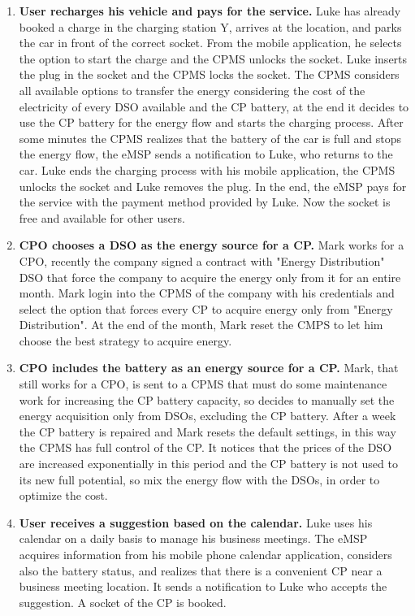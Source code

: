 \documentclass{Configuration_Files/PoliMi3i_thesis}
\begin{document}
\begin{enumerate}
    \item \textbf{User recharges his vehicle and pays for the service.} \newline
    Luke has already booked a charge in the charging station Y, arrives at the location, and parks the car in front of the correct socket. From the mobile application, he selects the option to start the charge and the CPMS unlocks the socket. Luke inserts the plug in the socket and the CPMS locks the socket. The CPMS considers all available options to transfer the energy considering the cost of the electricity of every DSO available and the CP battery, at the end it decides to use the CP battery for the energy flow and starts the charging process. After some minutes the CPMS realizes that the battery of the car is full and stops the energy flow, the eMSP sends a notification to Luke, who returns to the car. Luke ends the charging process with his mobile application, the CPMS unlocks the socket and Luke removes the plug. In the end, the eMSP pays for the service with the payment method provided by Luke. Now the socket is free and available for other users.

    \item \textbf{CPO chooses a DSO as the energy source for a CP.} \newline
    Mark works for a CPO, recently the company signed a contract with "Energy Distribution" DSO that force the company to acquire the energy only from it for an entire month. Mark login into the CPMS of the company with his credentials and select the option that forces every CP to acquire energy only from "Energy Distribution". At the end of the month, Mark reset the CMPS to let him choose the best strategy to acquire energy.

    \item \textbf{CPO includes the battery as an energy source for a CP.} \newline
    Mark, that still works for a CPO, is sent to a CPMS that must do some maintenance work for increasing the CP battery capacity, so decides to manually set the energy acquisition only from DSOs, excluding the CP battery. After a week the CP battery is repaired and Mark resets the default settings, in this way the CPMS has full control of the CP. It notices that the prices of the DSO are increased exponentially in this period and the CP battery is not used to its new full potential, so mix the energy flow with the DSOs, in order to optimize the cost.

    \item \textbf{User receives a suggestion based on the calendar.} \newline
    Luke uses his calendar on a daily basis to manage his business meetings. The eMSP acquires information from his mobile phone calendar application, considers also the battery status, and realizes that there is a convenient CP near a business meeting location. It sends a notification to Luke who accepts the suggestion. A socket of the CP is booked.
\end{enumerate}
\end{document}
